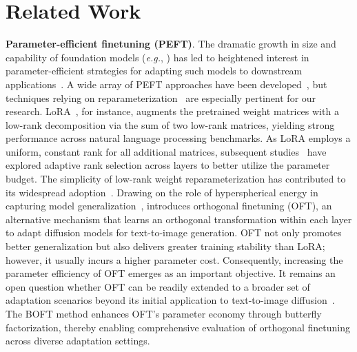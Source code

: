 \section{Related Work}

\textbf{Parameter-efficient finetuning (PEFT)}. The dramatic growth in size and capability of foundation models (\emph{e.g.}, \cite{brown2020language,radford2021learning,rombach2022high,kirillov2023segment}) has led to heightened interest in parameter-efficient strategies for adapting such models to downstream applications~\cite{treviso2023efficient,ding2023parameter,lialin2023scaling}. A wide array of PEFT approaches have been developed~\cite{houlsby2019parameter,aghajanyan2020intrinsic,hulora2022,edalati2022krona,wang2022adamix,gheini2021cross,zaken2022bitfit,guo2020parameter,sung2021training,ansell2022composable,lester2021power,li2021prefix,vu2022spot,he2021towards,mao2021unipelt,karimi2021compacter,liu2022few,sung2022lst,chen2022parameter,jia2022visual,chen2022adaptformer,zhang2022neural,jie2023fact,lian2022scaling,luo2023towards}, but techniques relying on reparameterization~\cite{aghajanyan2020intrinsic,hulora2022,edalati2022krona} are especially pertinent for our research. LoRA~\cite{hulora2022}, for instance, augments the pretrained weight matrices with a low-rank decomposition via the sum of two low-rank matrices, yielding strong performance across natural language processing benchmarks. As LoRA employs a uniform, constant rank for all additional matrices, subsequent studies~\cite{zhang2022adaptive,valipour2022dylora,zhang2023increlora} have explored adaptive rank selection across layers to better utilize the parameter budget. The simplicity of low-rank weight reparameterization has contributed to its widespread adoption~\cite{dettmers2023qlora,zi2023delta,chavan2023one}. Drawing on the role of hyperspherical energy in capturing model generalization~\cite{liu2018learning,liu2021orthogonal}, \cite{qiu2023controlling} introduces orthogonal finetuning (OFT), an alternative mechanism that learns an orthogonal transformation within each layer to adapt diffusion models for text-to-image generation. OFT not only promotes better generalization but also delivers greater training stability than LoRA; however, it usually incurs a higher parameter cost. Consequently, increasing the parameter efficiency of OFT emerges as an important objective. It remains an open question whether OFT can be readily extended to a broader set of adaptation scenarios beyond its initial application to text-to-image diffusion~\cite{qiu2023controlling}. The BOFT method enhances OFT’s parameter economy through butterfly factorization, thereby enabling comprehensive evaluation of orthogonal finetuning across diverse adaptation settings.

